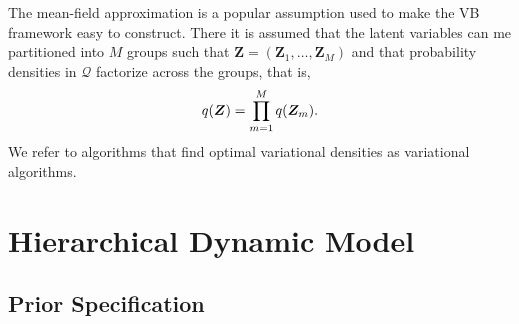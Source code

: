 The mean-field approximation is a popular assumption used to make the VB framework easy to construct. There it is assumed that the latent variables can me partitioned into $M$ groups such that ${\bm Z} = \left({\bm Z}_1, \ldots, {\bm Z}_M \right)$  and that probability densities in $\mathcal{Q}$ factorize across the groups, that is,
\begin{equation}
	q \mleft( {\bm Z} \mright) = \prod_{m = 1}^M q \mleft( {\bm Z}_m \mright).
\end{equation}
We refer to algorithms that find optimal variational densities as variational algorithms.

\section{Hierarchical Dynamic Model}

\subsection{Prior Specification}

\clearpage